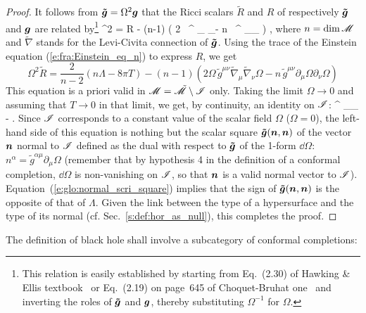 \begin{proof}
It follows from $\bm{\tilde{g}} = \Omega^2 \bm{g}$ that the Ricci scalars $\tilde{R}$
and $R$ of respectively $\bm{\tilde{g}}$ and $\bm{g}$ are related by\footnote{This relation is
easily established by starting from Eq.~(2.30) of Hawking \& Ellis textbook~\cite{HawkiE73} or Eq.~(2.19) on page~645 of Choquet-Bruhat one~\cite{Choqu09} and inverting the roles of $\bm{\tilde{g}}$ and $\bm{g}$, thereby substituting
$\Omega^{-1}$ for $\Omega$.}
\be \label{e:glo:tildeR_R}
    \Omega^2  = R - (n-1) \left( 2 \Omega \, ^{\mu\nu} \tilde{\nabla}_\mu
    \tilde{\nabla}_\nu \Omega - n \, ^{\mu\nu} \partial_\mu \Omega \partial_\nu \Omega
    \right) ,
\ee
where $n = \mathrm{dim}\, \mathscr{M}$ and $\tilde{\nabla}$ stands for the Levi-Civita connection of
$\bm{\tilde{g}}$. Using the trace of the Einstein equation (\ref{e:fra:Einstein_eq_n}) to
express $R$, we get
\[
    \Omega^2 \tilde{R} = \frac{2}{n-2}\left( n \Lambda - 8\pi T \right)
     - (n-1) \left( 2 \Omega \, \tilde{g}^{\mu\nu} \tilde{\nabla}_\mu
    \tilde{\nabla}_\nu \Omega - n \, \tilde{g}^{\mu\nu} \partial_\mu \Omega \partial_\nu \Omega
    \right)
\]
This equation is a priori valid in $\mathscr{M} = \tilde{\mathscr{M}}\setminus\mathscr{I}$ only.
Taking the limit $\Omega\rightarrow 0$ and
assuming that $T\rightarrow 0$ in that limit, we get, by continuity, an identity
on $\mathscr{I}$:
\be \label{e:glo:normal_scri_square}
^{\mu\nu} \partial_\mu \Omega \partial_\nu \Omega \stackrel{\scri}{=}
    -  \Lambda .
\ee
Since $\mathscr{I}$ corresponds to a constant value of the scalar field $\Omega$ ($\Omega=0$),
the left-hand side of this equation is nothing but the scalar square
$\bm{\tilde{g}}(\bm{n},\bm{n})$ of the vector $\bm{n}$ normal to $\mathscr{I}$
defined as the dual with respect to $\bm{\tilde{g}}$ of the 1-form
$\dd\Omega$: $n^\alpha = \tilde{g}^{\alpha\mu} \partial_\mu \Omega$
(remember that by hypothesis 4 in the definition
of a conformal completion, $\dd\Omega$ is non-vanishing on $\mathscr{I}$, so that
$\bm{n}$  is a valid normal
vector to $\mathscr{I}$). Equation~(\ref{e:glo:normal_scri_square}) implies
that the sign of $\bm{\tilde{g}}(\bm{n},\bm{n})$ is the opposite of that of $\Lambda$.
Given the link between the type of a hypersurface and the type of its normal
(cf. Sec.~\ref{s:def:hor_as_null}), this completes the proof.
\end{proof}

The definition of black hole shall involve a subcategory of conformal completions:

